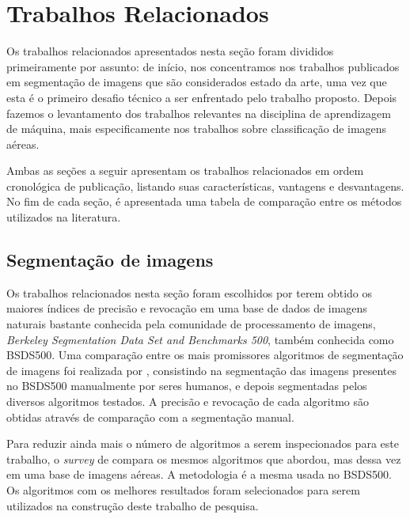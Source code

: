 \chapter{Trabalhos Relacionados}


Os trabalhos relacionados apresentados nesta seção foram divididos primeiramente por assunto: de início, nos concentramos nos trabalhos publicados em segmentação de imagens que são considerados estado da arte, uma vez que esta é o primeiro desafio técnico a ser enfrentado pelo trabalho proposto. Depois fazemos o levantamento dos trabalhos relevantes na disciplina de aprendizagem de máquina, mais especificamente nos trabalhos sobre classificação de imagens aéreas.

Ambas as seções a seguir apresentam os trabalhos relacionados em ordem cronológica de publicação, listando suas características, vantagens e desvantagens. No fim de cada seção, é apresentada uma tabela de comparação entre os métodos utilizados na literatura.

\section{Segmentação de imagens}


Os trabalhos relacionados nesta seção foram escolhidos por terem obtido os maiores índices de precisão e revocação em uma base de dados de imagens naturais bastante conhecida pela comunidade de processamento de imagens, \textit{Berkeley Segmentation Data Set and Benchmarks 500}, também conhecida como BSDS500. Uma comparação entre os mais promissores algoritmos de segmentação de imagens foi realizada por , consistindo na segmentação das imagens presentes no BSDS500 manualmente por seres humanos, e depois segmentadas pelos diversos algoritmos testados. A precisão e revocação de cada algoritmo são obtidas através de comparação com a segmentação manual.

Para reduzir ainda mais o número de algoritmos a serem inspecionados para este trabalho, o \textit{survey} de  compara os mesmos algoritmos que  abordou, mas dessa vez em uma base de imagens aéreas. A metodologia é a mesma usada no BSDS500. Os algoritmos com os melhores resultados foram selecionados para serem utilizados na construção deste trabalho de pesquisa.

